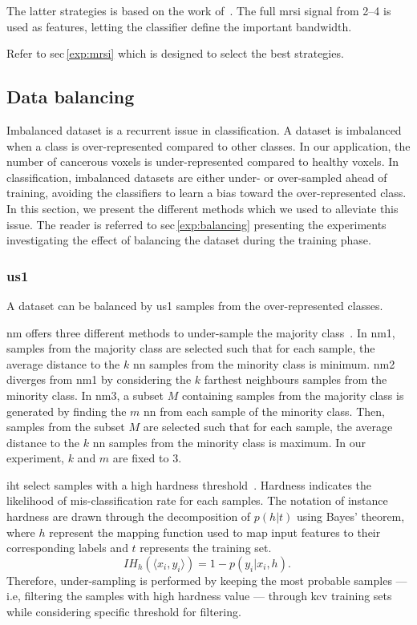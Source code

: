 \documentclass[a4paper,num-refs]{wiley-article}
\begin{document}
The latter strategies is based on the work of~\cite{Parfait2012}. The full
\ac{mrsi} signal from \SIrange{2}{4}{\ppm} is used as features, letting the
classifier define the important \si{\ppm} bandwidth.

Refer to \acs{sec}\,\ref{exp:mrsi} which is designed to select the best
strategies.

\subsection{Data balancing}

Imbalanced dataset is a recurrent issue in classification. A dataset is
imbalanced when a class is over-represented compared to other classes. In our
application, the number of cancerous voxels is under-represented compared to
healthy voxels. In classification, imbalanced datasets are either under- or
over-sampled ahead of training, avoiding the classifiers to learn a bias toward
the over-represented class. In this section, we present the different methods
which we used to alleviate this issue. The reader is referred to
\acs{sec}\,\ref{exp:balancing} presenting the experiments investigating the
effect of balancing the dataset during the training phase.

\subsubsection{\Acl*{us1}}

A dataset can be balanced by \ac{us1} samples from the over-represented
classes.

\Ac{nm} offers three different methods to under-sample the majority
class~\cite{mani2003knn}. In \ac{nm1}, samples from the majority class are
selected such that for each sample, the average distance to the $k$ \ac{nn}
samples from the minority class is minimum. \ac{nm2} diverges from \ac{nm1} by
considering the $k$ farthest neighbours samples from the minority class. In
\ac{nm3}, a subset $M$ containing samples from the majority class is generated
by finding the $m$ \ac{nn} from each sample of the minority class. Then,
samples from the subset $M$ are selected such that for each sample, the average
distance to the $k$ \ac{nn} samples from the minority class is maximum. In our
experiment, $k$ and $m$ are fixed to 3.

\Ac{iht} select samples with a high hardness
threshold~\cite{smith2014instance}. Hardness indicates the likelihood of
mis-classification rate for each samples. The notation of instance hardness
are drawn through the decomposition of $p(h \vert t)$ using Bayes' theorem,
where $h$ represent the mapping function used to map input features to their
corresponding labels and $t$ represents the training set.
\begin{equation}
  IH_h(\langle x_{i}, y_{i}\rangle) = 1 - p(y_i \vert x_i, h).\
  \label{eq:iht}
\end{equation}
Therefore, under-sampling is performed by keeping the most probable samples ---
i.e, filtering the samples with high hardness value --- through \ac{kcv}
training sets while considering specific threshold for filtering.
\end{document}
